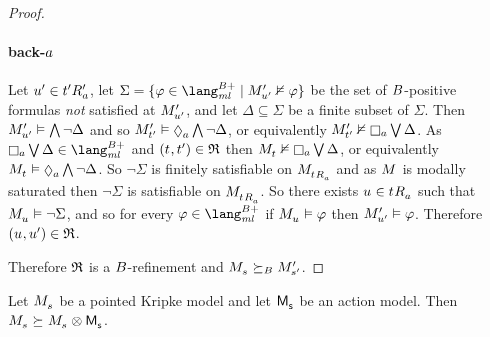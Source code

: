 \begin{proof}
\paragraph{back-$a$}
Let ${u}^{\prime} \in {{t}^{\prime}} {R^{\prime}_{a}}$, let $\Sigma = \{\phi \in \langMlPlusBs \mid \kPModelP{\kStateUP} \nentails \phi\}$ be the set of $B$-positive formulas {\em not} satisfied at ${M^{\prime}_{{u}^{\prime}}}$, and let $\Delta \subseteq \Sigma$ be a finite subset of $\Sigma$.
Then ${M^{\prime}_{{u}^{\prime}}} \vDash \bigwedge \lnot \Delta$ and so $\kPModelP{\kStateTP} \entails \possibleA \bigwedge \lnot \Delta$, or equivalently $\kPModelP{\kStateTP} \nentails \necessaryA \bigvee \Delta$.
As $\necessaryA \bigvee \Delta \in \langMlPlusBs$ and $(\kStateT, \kStateTP) \in \refinement$ then $\kPModel{\kStateT} \nentails \necessaryA \bigvee \Delta$, or equivalently $\kPModel{\kStateT} \entails \possibleA \bigwedge \lnot \Delta$.
So $\lnot \Sigma$ is finitely satisfiable on $\kPModel{\kSuccessorsA{\kStateT}}$ and as $\kModel$ is modally saturated then $\lnot \Sigma$ is satisfiable on $\kPModel{\kSuccessorsA{\kStateT}}$.
So there exists $\kStateU \in \kSuccessorsA{\kStateT}$ such that $\kPModel{\kStateU} \entails \lnot \Sigma$, and so for every $\phi \in \langMlPlusBs$ if $\kPModel{\kStateU} \entails \phi$ then ${M^{\prime}_{{u}^{\prime}}} \vDash \varphi$.
Therefore $(\kStateU, \kStateUP) \in \refinement$.

Therefore $\mathfrak{R}$ is a $B$-refinement and $\kPModel{\kStateS} \simulatesBs \kPModelP{\kStateSP}$.
\end{proof}

\begin{proposition}
Let $\kPModel{\kStateS}$ be a pointed Kripke model and let $\aPModel{\aStateS}$ be an action model.
Then $\kPModel{\kStateS} \simulates \kPModel{\kStateS} \exec \aPModel{\aStateS}$.
\end{proposition}

